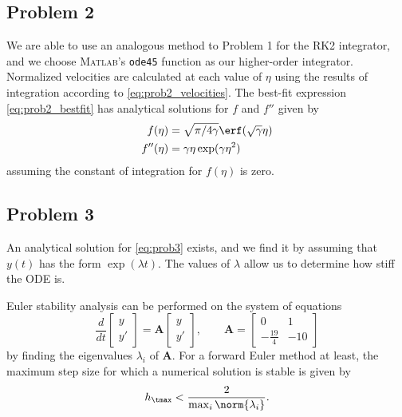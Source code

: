 \documentclass[12pt]{article}
\begin{document}
\subsection{Problem 2}

We are able to use an analogous method to Problem 1 for the RK2 integrator, and we choose \textsc{Matlab}'s \lstinline|ode45| function as our higher-order integrator. Normalized velocities are calculated at each value of $\eta$ using the results of integration according to \eqref{eq:prob2_velocities}. The best-fit expression \eqref{eq:prob2_bestfit} has analytical solutions for $f$ and $f''$ given by
\begin{equation}
\begin{aligned}
f(\eta) &= \sqrt{\pi / 4 \gamma} \erf(\sqrt{\gamma} \eta)
\\
f''(\eta) &= \gamma \eta \exp(\gamma \eta^2)
\end{aligned}
\end{equation}
assuming the constant of integration for $f(\eta)$ is zero.

\subsection{Problem 3}

An analytical solution for \eqref{eq:prob3} exists, and we find it by assuming that $y(t)$ has the form $\exp(\lambda t)$. The values of $\lambda$ allow us to determine how stiff the ODE is.

Euler stability analysis can be performed on the system of equations
\begin{equation}
\frac{d}{dt}
\begin{bmatrix}
y \\
y'
\end{bmatrix}
=
\mathbf{A}
\begin{bmatrix}
y \\
y'
\end{bmatrix}
, \qquad
\mathbf{A}
=
\begin{bmatrix}
0 & 1 \\
-\frac{19}{4} & -10
\end{bmatrix}
\end{equation}
by finding the eigenvalues $\lambda_i$ of $\mathbf{A}$. For a forward Euler method at least, the maximum step size for which a numerical solution is stable is given by
\begin{equation}
h_\tmax < \frac{2}{\max_i\norm{\lambda_i}}
.
\end{equation}
\end{document}
